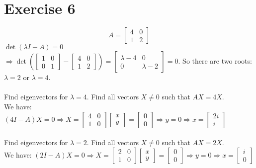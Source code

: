 \documentclass{article}
\begin{document}
\section{Exercise 6}
\[
A=
  \begin{bmatrix}
    4 & 0 \\
    1 & 2 
  \end{bmatrix}
\]
$\det(\lambda I-A) = 0$ \\
$\Rightarrow \det\left( 
\begin{bmatrix}
    1 & 0 \\
    0 & 1 
\end{bmatrix} -
\begin{bmatrix}
    4 & 0 \\
    1 & 2 
\end{bmatrix}\right) = 
\begin{bmatrix}
    \lambda - 4  & 0 \\
    0 & \lambda -2 
\end{bmatrix} = 0.$
So there are two roots: \\
$\lambda = 2$ or $\lambda = 4$.    
\\
\\
Find eigenvectors for $\lambda = 4$. Find all vectors $X \neq 0$ such that $AX = 4X$.
\\
We have:
$(4I - A) X = 0 \Rightarrow X =   
\begin{bmatrix}
    4 & 0 \\
    1 & 0 
\end{bmatrix}
\begin{bmatrix}
    x  \\
    y  
\end{bmatrix} = \begin{bmatrix}
    0  \\
    0  
\end{bmatrix} \Rightarrow y = 0 \Rightarrow x = \begin{bmatrix}
2i  \\
i  
\end{bmatrix}$
\\
\\
Find eigenvectors for $\lambda = 2$. Find all vectors $X \neq 0$ such that $AX = 2X$.
\\
We have:
$(2I - A) X = 0 \Rightarrow X =   
\begin{bmatrix}
    2 & 0 \\
    1 & 0 
\end{bmatrix}
\begin{bmatrix}
    x  \\
    y  
\end{bmatrix} = \begin{bmatrix}
    0  \\
    0  
\end{bmatrix} \Rightarrow y = 0 \Rightarrow x = \begin{bmatrix}
i  \\
0  
\end{bmatrix}$
\end{document}

